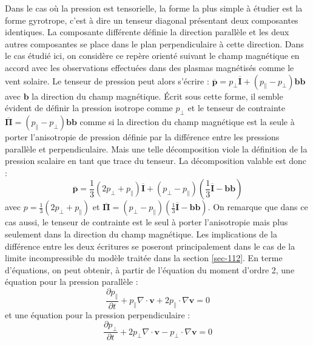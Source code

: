 Dans le cas où la pression est tensorielle, la forme la plus simple à étudier est la forme gyrotrope, c'est à dire un tenseur diagonal présentant deux composantes identiques. La composante différente définie la direction parallèle et les deux autres composantes se place dans le plan perpendiculaire à cette direction. Dans le cas étudié ici, on considère ce repère orienté suivant le champ magnétique en accord avec les observations effectuées dans des plasmas magnétisés comme le vent solaire. Le tenseur de pression peut alors s'écrire : $\overline{\mathbf{p}} = p_{\perp} \overline{\mathbf{I}} + (p_{\parallel} - p_{\perp}) \mathbf{b} \mathbf{b} $ avec $\mathbf{b}$ la direction du champ magnétique. Écrit sous cette forme, il semble évident de définir la pression isotrope comme $p_{\perp}$ et le tenseur de contrainte $\overline{\mathbf{\Pi}} =(p_{\parallel} - p_{\perp}) \mathbf{b} \mathbf{b}$ comme si la direction du champ magnétique est la seule à porter l'anisotropie de pression définie par la différence entre les pressions parallèle et perpendiculaire. Mais une telle décomposition viole la définition de la pression scalaire en tant que trace du tenseur. La décomposition valable est donc :  
\begin{equation}
    \overline{\mathbf{p}} = \frac{1}{3}(2p_{\perp} + p_{\parallel}) \overline{\mathbf{I}} + (p_{\perp} - p_{\parallel}) (\frac{1}{3} \overline{\mathbf{I}} - \mathbf{b} \mathbf{b})
\end{equation}
avec $p =  \frac{1}{3}(2p_{\perp} + p_{\parallel}) $ et $\overline{\mathbf{\Pi}} = (p_{\perp} - p_{\parallel}) (\frac{1}{3} \overline{\mathbf{I}} - \mathbf{b} \mathbf{b})$. On remarque que dans ce cas aussi, le tenseur de contrainte est le seul à porter l'anisotropie mais plus seulement dans la direction du champ magnétique. Les implications de la différence entre les deux écritures se poseront principalement dans le cas de la limite incompressible du modèle traitée dans la section \ref{sec-112}. 
En terme d'équations, on peut obtenir, à partir de l'équation du moment d'ordre 2, une équation pour la pression parallèle : 
\begin{equation}
\frac{\partial p_{\parallel}}{\partial t} + p_{\parallel} \nabla \cdot \mathbf{v} + 2 p_{\parallel} \cdot \nabla \mathbf{v} = 0 \label{eq:model_ppar}
\end{equation}
et une équation pour la pression perpendiculaire : 
\begin{equation}
\frac{\partial p_{\perp}}{\partial t} + 2 p_{\perp} \nabla \cdot \mathbf{v} - p_{\perp} \cdot \nabla \mathbf{v} = 0 \label{eq:model_pperp}
\end{equation}
